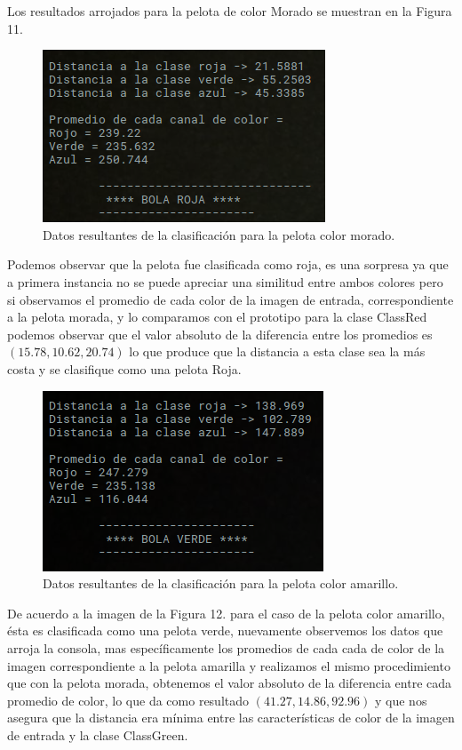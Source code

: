 \documentclass[conference]{IEEEtran}
\begin{document}
Los resultados arrojados para la pelota de color Morado se muestran en la Figura 11.
\begin{figure}[h]
	\setlength{\unitlength}{0.0105in}
	\centering
	\includegraphics[scale=0.41]{./images/Console1.png}
	\caption{ Datos resultantes de la clasificaci\'on para la pelota color morado. }
\end{figure}

Podemos observar que la pelota fue clasificada como roja, es una sorpresa ya que a primera instancia no se puede apreciar una similitud entre ambos colores pero si observamos el promedio de cada color de la imagen de entrada, correspondiente a la pelota morada, y lo comparamos con el prototipo para la clase ClassRed podemos observar que el valor absoluto de la diferencia entre los promedios es $(15.78, 10.62, 20.74)$ lo que produce que la distancia a esta clase sea la m\'as costa y se clasifique como una pelota Roja. 

\begin{figure}[h]
	\setlength{\unitlength}{0.0105in}
	\centering
	\includegraphics[scale=0.41]{./images/Console2.png}
	\caption{ Datos resultantes de la clasificaci\'on para la pelota color amarillo. }
\end{figure}

\newpage
De acuerdo a la imagen de la Figura 12. para el caso de la pelota color amarillo, \'esta es clasificada como una pelota verde, nuevamente observemos los datos que arroja la consola, mas espec\'ificamente los promedios de cada cada de color de la imagen correspondiente a la pelota amarilla y realizamos el mismo procedimiento que con la pelota morada, obtenemos el valor absoluto de la diferencia entre cada promedio de color, lo que da como resultado $(41.27, 14.86, 92.96)$ y que nos asegura que la distancia era m\'inima entre las caracter\'isticas de color de la imagen de entrada y la clase ClassGreen.
\end{document}
